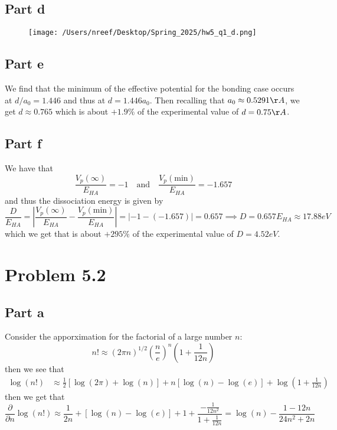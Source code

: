 \documentclass[12pt]{report}
\theoremstyle{custom}
\begin{document}
\subsection*{Part d}
\begin{figure}[H]
  \centering
  \texttt{[image: /Users/nreef/Desktop/Spring\_2025/hw5\_q1\_d.png]}
\end{figure}

\subsection*{Part e}
We find that the minimum of the effective potential for the bonding case occurs at $d/a_0 = 1.446$ and thus at $d = 1.446a_0$. Then recalling that $a_0 \approx 0.5291 \AA$, we get $d \approx 0.765$ which is about $+1.9 \%$ of the experimental value of $d = 0.75 \AA$.

\subsection*{Part f}
We have that
\begin{equation*}
  \frac{V_p(\infty)}{E_{HA}} = -1 \quad \text{and} \quad \frac{V_p(\text{min})}{E_{HA}} = -1.657
\end{equation*}
and thus the dissociation energy is given by
\begin{equation*}
  \frac{D}{E_{HA}} = \left|\frac{V_p(\infty)}{E_{HA}} - \frac{V_p(\text{min})}{E_{HA}}\right| = |-1 - (-1.657)| = 0.657 \implies D = 0.657E_{HA} \approx 17.88\si{eV}
\end{equation*}
which we get that is about $+295 \%$ of the experimental value of $D = 4.52 \si{eV}$.

\section*{Problem 5.2}
\subsection*{Part a}
Consider the apporximation for the factorial of a large number $n$:
\begin{equation*}
n! \approx (2\pi n)^{1/2}\left(\frac{n}{e}\right)^n \left(1 + \frac{1}{12n}\right)
\end{equation*}
then we see that
\begin{align*}
  \log(n!) &\approx \frac{1}{2}\left[\log(2\pi) + \log(n)\right] + n\left[\log(n) - \log(e)\right] + \log\left(1 + \frac{1}{12n}\right)
\end{align*}
then we get that 
\begin{equation*}
  \frac{\partial}{\partial n} \log(n!) \approx \frac{1}{2n} + [\log(n) - \log(e)] + 1 + \frac{-\frac{1}{12n^2}}{1 + \frac{1}{12n}} = \log(n) - \frac{1 - 12n}{24n^2 + 2n}
\end{equation*}
\end{document}
